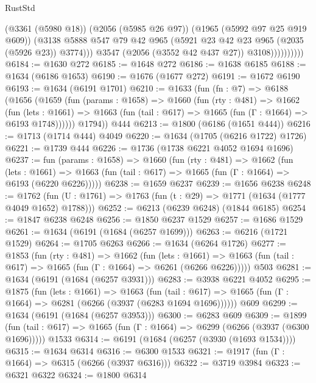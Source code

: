 \begin{lexlean}{RustStd}
\begin{coremodule}
                          (@3361 (@5980 @18))
                          (@2056 (@5985 @26 @97))
                          (@1965 (@5992 @97 @25 @919 @609))
                          (@3138
                            @5888
                            @547
                            @79
                            @42
                            @965
                            (@5921 @23 @42 @23 @965 (@2035 (@5926 @23)) @3774)))
                        @3547
                        (@2056 (@3552 @42 @437 @27))
                        @3108))))))))))
@6184 := @1630 @272
@6185 := @1648 @272
@6186 := @1638 @6185
@6188 := @1634 (@6186 @1653)
@6190 := @1676 (@1677 @272)
@6191 := @1672 @6190
@6193 := @1634 (@6191 @1701)
@6210 := @1633
    (fun (fn : @7) =>
    @6188
      (@1656
        (@1659
          (fun (params : @1658) =>
          @1660
            (fun (rty : @481) =>
            @1662
              (fun (lets : @1661) =>
              @1663 (fun (tail : @617) => @1665 (fun (Γ : @1664) => @6193 @1748))))))
        @1794))
    @444
@6213 := @1800 (@6186 (@1651 @444))
@6216 := @1713 (@1714 @444) @4049
@6220 := @1634 (@1705 (@6216 @1722) @1726)
@6221 := @1739 @444
@6226 := @1736 (@1738 @6221 @4052 @1694 @1696)
@6237 := fun (params : @1658) =>
  @1660
    (fun (rty : @481) =>
    @1662
      (fun (lets : @1661) =>
      @1663 (fun (tail : @617) => @1665 (fun (Γ : @1664) => @6193 (@6220 @6226)))))
@6238 := @1659 @6237
@6239 := @1656 @6238
@6248 := @1762 (fun (U : @1761) => @1763 (fun (t : @29) => @1771 (@1634 (@1777 @4049 @1652) @1788)))
@6252 := @6213 (@6239 @6248) (@1844 @6185)
@6254 := @1847 @6238 @6248
@6256 := @1850 @6237 @1529
@6257 := @1686 @1529
@6261 := @1634 (@6191 (@1684 (@6257 @1699)))
@6263 := @6216 (@1721 @1529)
@6264 := @1705 @6263
@6266 := @1634 (@6264 @1726)
@6277 := @1853
    (fun (rty : @481) =>
    @1662
      (fun (lets : @1661) =>
      @1663 (fun (tail : @617) => @1665 (fun (Γ : @1664) => @6261 (@6266 @6226)))))
    @503
@6281 := @1634 (@6191 (@1684 (@6257 @3931)))
@6283 := @3938 @6221 @4052
@6295 := @1875
    (fun (lets : @1661) =>
    @1663
      (fun (tail : @617) => @1665 (fun (Γ : @1664) => @6281 (@6266 (@3937 (@6283 @1694 @1696))))))
    @609
@6299 := @1634 (@6191 (@1684 (@6257 @3953)))
@6300 := @6283 @609
@6309 := @1899
    (fun (tail : @617) => @1665 (fun (Γ : @1664) => @6299 (@6266 (@3937 (@6300 @1696)))))
    @1533
@6314 := @6191 (@1684 (@6257 (@3930 (@1693 @1534))))
@6315 := @1634 @6314
@6316 := @6300 @1533
@6321 := @1917 (fun (Γ : @1664) => @6315 (@6266 (@3937 @6316)))
@6322 := @3719 @3984
@6323 := @6321 @6322
@6324 := @1800 @6314

\end{coremodule}
\end{lexlean}
